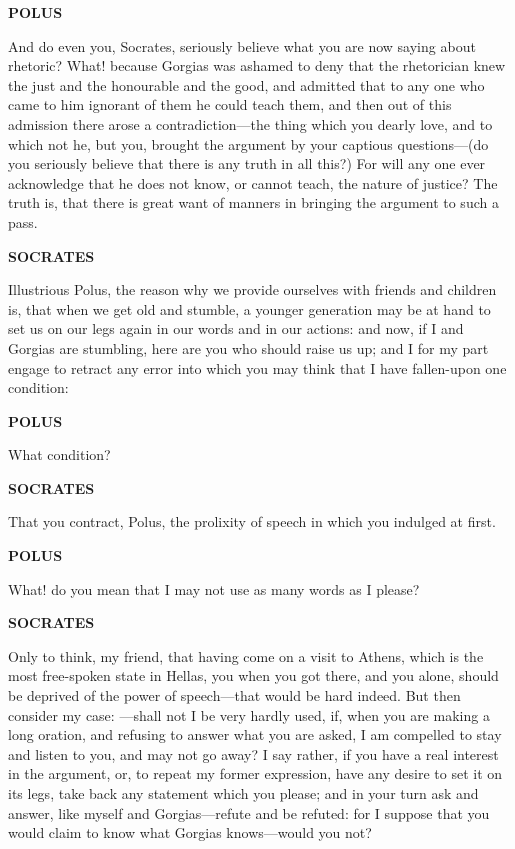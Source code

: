 \documentclass[11pt,letter]{article}
\begin{document}
\par \textbf{POLUS}
\par   And do even you, Socrates, seriously believe what you are now saying about rhetoric? What! because Gorgias was ashamed to deny that the rhetorician knew the just and the honourable and the good, and admitted that to any one who came to him ignorant of them he could teach them, and then out of this admission there arose a contradiction—the thing which you dearly love, and to which not he, but you, brought the argument by your captious questions—(do you seriously believe that there is any truth in all this?) For will any one ever acknowledge that he does not know, or cannot teach, the nature of justice? The truth is, that there is great want of manners in bringing the argument to such a pass.

\par \textbf{SOCRATES}
\par   Illustrious Polus, the reason why we provide ourselves with friends and children is, that when we get old and stumble, a younger generation may be at hand to set us on our legs again in our words and in our actions:  and now, if I and Gorgias are stumbling, here are you who should raise us up; and I for my part engage to retract any error into which you may think that I have fallen-upon one condition:

\par \textbf{POLUS}
\par   What condition?

\par \textbf{SOCRATES}
\par   That you contract, Polus, the prolixity of speech in which you indulged at first.

\par \textbf{POLUS}
\par   What! do you mean that I may not use as many words as I please?

\par \textbf{SOCRATES}
\par   Only to think, my friend, that having come on a visit to Athens, which is the most free-spoken state in Hellas, you when you got there, and you alone, should be deprived of the power of speech—that would be hard indeed. But then consider my case: —shall not I be very hardly used, if, when you are making a long oration, and refusing to answer what you are asked, I am compelled to stay and listen to you, and may not go away? I say rather, if you have a real interest in the argument, or, to repeat my former expression, have any desire to set it on its legs, take back any statement which you please; and in your turn ask and answer, like myself and Gorgias—refute and be refuted:  for I suppose that you would claim to know what Gorgias knows—would you not?
\end{document}
